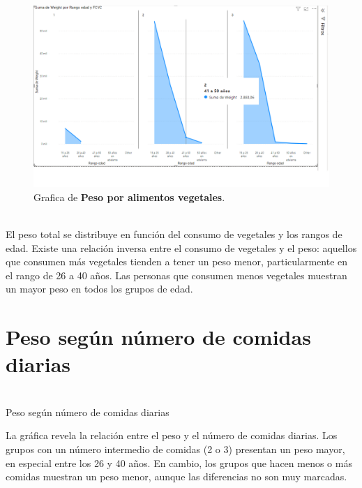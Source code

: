 \documentclass[a4paper]{report} %
\begin{document}
            \paragraph{}\mbox{} \\
              \begin{figure}[htb]
                \centering
                  \includegraphics[width=\textwidth]{Images/pesoporalimentosvegetales.png}
                  \caption{Grafica de \textbf{Peso por alimentos vegetales}.}
              \end{figure} \\


El peso total se distribuye en función del consumo de vegetales y los rangos de edad. Existe una relación inversa entre el consumo de vegetales y el peso: aquellos que consumen más vegetales tienden a tener un peso menor, particularmente en el rango de 26 a 40 años. Las personas que consumen menos vegetales muestran un mayor peso en todos los grupos de edad.

        \section{Peso según número de comidas diarias}
            \paragraph{}\mbox{} \\
           Peso según número de comidas diarias
           
La gráfica revela la relación entre el peso y el número de comidas diarias. Los grupos con un número intermedio de comidas (2 o 3) presentan un peso mayor, en especial entre los 26 y 40 años. En cambio, los grupos que hacen menos o más comidas muestran un peso menor, aunque las diferencias no son muy marcadas.
\end{document}
